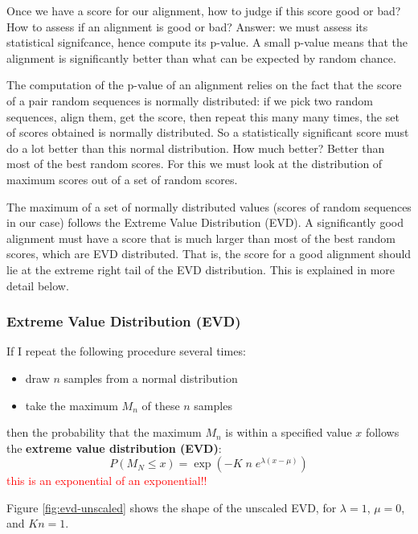 Once we have a score for our alignment, how to judge if this score good or bad? How to assess if an alignment is good or bad? Answer: we must assess its statistical signifcance, hence compute its p-value. A small p-value means that the alignment is significantly better than what can be expected by random chance.

The computation of the p-value of an alignment relies on the fact that the score of a pair random sequences is normally distributed: if we pick two random sequences, align them, get the score, then repeat this many many times, the set of scores obtained is normally distributed. So a statistically significant score must do a lot better than this normal distribution. How much better? Better than most of the best random scores. For this we must look at the distribution of maximum scores out of a set of random scores.

The maximum of a set of normally distributed values (scores of random sequences in our case) follows the Extreme Value Distribution (EVD). A significantly good alignment must have a score that is much larger than most of the best random scores, which are EVD distributed. That is, the score for a good alignment should lie at the extreme right tail of the EVD distribution. This is explained in more detail below.

\subsubsection{Extreme Value Distribution (EVD)}

If I repeat the following procedure several times:
\begin{itemize}
\item draw $n$ samples from a normal distribution
\item take the maximum $M_n$ of these $n$ samples
\end{itemize}
then the probability that the maximum $M_n$ is within a specified value $x$ follows the {\bf extreme value distribution (EVD)}:
%
\begin{equation}
P(M_N \le x) = \exp(- K \; n \; e^{\lambda(x - \mu)} )
\label{eq:evd}
\end{equation}
\textcolor{red}{this is an exponential of an exponential!!}

Figure \ref{fig:evd-unscaled} shows the shape of the unscaled EVD, for $\lambda=1$, $\mu =0$, and $Kn= 1$.

